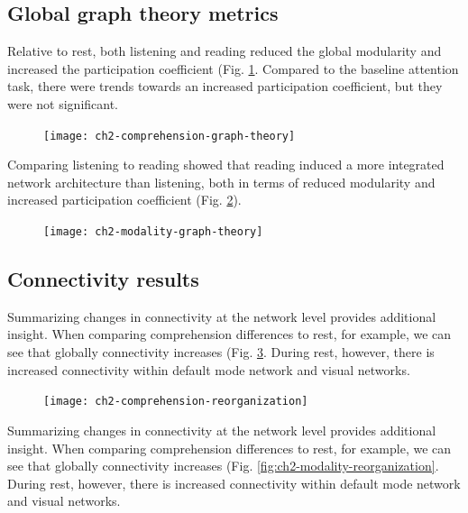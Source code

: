 \subsection{Global graph theory metrics}

Relative to rest, both listening and reading reduced the global modularity and increased the participation coefficient (Fig. \ref{fig:ch2-comprehension-graph-theory}. Compared to the baseline attention task, there were  trends towards an increased participation coefficient, but they were not significant. 

\begin{figure}[b]
	\centering
	\texttt{[image: ch2-comprehension-graph-theory]}
    \caption[Language induces more integrated global network architecture.]{}
	\label{fig:ch2-comprehension-graph-theory}
\end{figure}

Comparing listening to reading showed that reading induced a more integrated network architecture than listening, both in terms of reduced modularity and increased participation coefficient (Fig. \ref{fig:ch2-modality-graph-theory}).  

\begin{figure}[b]
	\centering
	\texttt{[image: ch2-modality-graph-theory]}
    \caption[Reading is more integrated than listening.]{}
	\label{fig:ch2-modality-graph-theory}
\end{figure}

\subsection{Connectivity results}

Summarizing changes in connectivity at the network level provides additional insight. When comparing comprehension differences to rest, for example, we can see that globally connectivity increases (Fig. \ref{fig:ch2-comprehension-reorganization}. During rest, however, there is increased connectivity within default mode network and visual networks.

\begin{figure}[b]
	\centering
	\texttt{[image: ch2-comprehension-reorganization]}
    \caption[Language increases between-network connectivity.]{}
	\label{fig:ch2-comprehension-reorganization}
\end{figure}

Summarizing changes in connectivity at the network level provides additional insight. When comparing comprehension differences to rest, for example, we can see that globally connectivity increases (Fig. \ref{fig:ch2-modality-reorganization}. During rest, however, there is increased connectivity within default mode network and visual networks.

